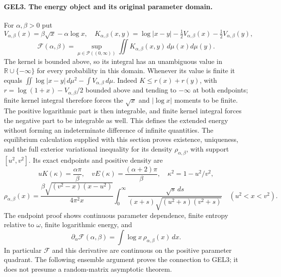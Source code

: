 \documentclass[11pt,a4paper]{article}
\begin{document}
\paragraph{GEL3. The energy object and its original parameter domain.}
For \(\alpha,\beta>0\) put
\[
 V_{\alpha,\beta}(x)=\beta\sqrt x-\alpha\log x,
 \quad K_{\alpha,\beta}(x,y)=\log|x-y|
           -\tfrac12V_{\alpha,\beta}(x)-\tfrac12V_{\alpha,\beta}(y),
\]
\[
 \mathcal F(\alpha,\beta)=\sup_{\mu\in\mathcal P((0,\infty))}
                   \iint K_{\alpha,\beta}(x,y)\,d\mu(x)d\mu(y).
 \tag{GEL7}
\]
The kernel is bounded above, so its integral has an unambiguous value
in \(\mathbb R\cup\{-\infty\}\) for every probability in this domain.
Whenever its value is finite it equals
\(\iint\log|x-y|\,d\mu^2-\int V_{\alpha,\beta}\,d\mu\).
Indeed \(K\leq r(x)+r(y)\), with
\(r=\log(1+x)-V_{\alpha,\beta}/2\) bounded above and tending to
\(-\infty\) at both endpoints; finite kernel integral therefore forces
the \(\sqrt x\) and \(|\log x|\) moments to be finite. The positive
logarithmic part is then integrable, and finite kernel integral forces
the negative part to be integrable as well. This defines the extended
energy without forming an indeterminate difference of infinite quantities.
The equilibrium calculation supplied with this section proves existence,
uniqueness, and the full exterior variational inequality for its density
\(\rho_{\alpha,\beta}\), with support \([u^2,v^2]\). Its exact endpoints
and positive density are
\[
 uK(\kappa)=\frac{\alpha\pi}{\beta},\quad
 vE(\kappa)=\frac{(\alpha+2)\pi}{\beta},\quad
 \kappa^2=1-u^2/v^2,
\]
\[
 \rho_{\alpha,\beta}(x)=
 \frac{\beta\sqrt{(v^2-x)(x-u^2)}}{4\pi^2x}
 \int_0^\infty
 \frac{\sqrt s\,ds}{(x+s)\sqrt{(u^2+s)(v^2+s)}}
       \quad(u^2<x<v^2).
 \tag{GEL8}
\]
The endpoint proof shows continuous parameter dependence, finite entropy
relative to \(\omega\), finite logarithmic energy, and
\[
 \partial_\alpha\mathcal F(\alpha,\beta)
       =\int\log x\,\rho_{\alpha,\beta}(x)\,dx.
 \tag{GEL9}
\]
In particular \(\mathcal F\) and this derivative are continuous on the
positive parameter quadrant. The following ensemble argument proves the
connection to GEL3; it does not presume a random-matrix asymptotic theorem.
\end{document}
